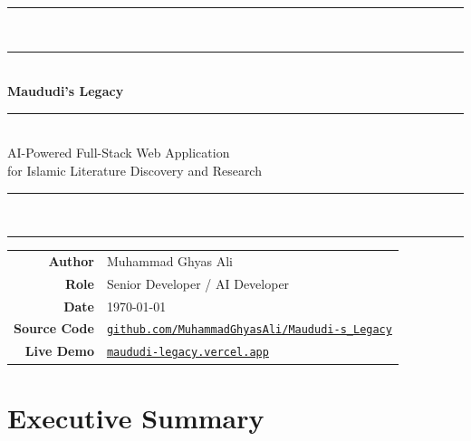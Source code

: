 \documentclass[11pt,a4paper]{article}
\begin{document}
\thispagestyle{empty}
\begin{center}
\vspace*{3.5cm}

{\color{navy}\rule{0.7\textwidth}{0.8pt}}\\[0.25cm]
{\color{gold}\rule{0.7\textwidth}{1.2pt}}\\[2cm]

{\fontsize{30}{36}\selectfont\bfseries\color{darknavy}
Maududi's Legacy}

{\color{gold}\rule{0.45\textwidth}{0.5pt}}\\[1.2em]

{\Large\color{darknavy!70} AI-Powered Full-Stack Web Application\\[0.15em]
for Islamic Literature Discovery and Research}\\[2.2cm]

{\color{navy}\rule{0.7\textwidth}{1.2pt}}\\[0.25cm]
{\color{gold}\rule{0.7\textwidth}{0.8pt}}

\vfill

\begin{minipage}{0.6\textwidth}
\centering
\renewcommand{\arraystretch}{1.35}
\begin{tabular}{rl}
\textbf{Author}          & Muhammad Ghyas Ali \\[0.3em]
\textbf{Role}            & Senior Developer / AI Developer \\[0.3em]
\textbf{Date}            & \today \\[0.3em]
\textbf{Source Code}     & \href{https://github.com/MuhammadGhyasAli/Maududi-s_Legacy}{\texttt{github.com/MuhammadGhyasAli/Maududi-s\_Legacy}} \\[0.3em]
\textbf{Live Demo}       & \href{https://maududi-legacy.vercel.app}{\texttt{maududi-legacy.vercel.app}} \\
\end{tabular}
\end{minipage}

\vspace{2.5cm}
\end{center}
\restoregeometry
\clearpage

\tableofcontents
\clearpage

\section{Executive Summary}
\end{document}
